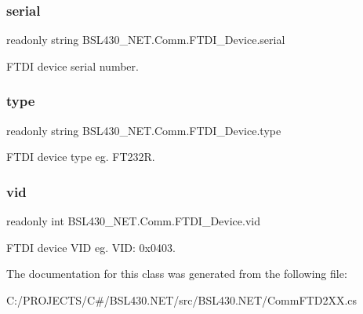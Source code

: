\subsubsection{\texorpdfstring{serial}{serial}}
{\footnotesize\ttfamily readonly string B\+S\+L430\+\_\+\+N\+E\+T.\+Comm.\+F\+T\+D\+I\+\_\+\+Device.\+serial}



F\+T\+DI device serial number. 

\mbox{\label{class_b_s_l430___n_e_t_1_1_comm_1_1_f_t_d_i___device_a08ecf8436a9e6e20ce5041d7899f822c}} 
\subsubsection{\texorpdfstring{type}{type}}
{\footnotesize\ttfamily readonly string B\+S\+L430\+\_\+\+N\+E\+T.\+Comm.\+F\+T\+D\+I\+\_\+\+Device.\+type}



F\+T\+DI device type eg. F\+T232R. 

\mbox{\label{class_b_s_l430___n_e_t_1_1_comm_1_1_f_t_d_i___device_a898c89b3775fbf5dd54da1fdf03330c0}} 
\subsubsection{\texorpdfstring{vid}{vid}}
{\footnotesize\ttfamily readonly int B\+S\+L430\+\_\+\+N\+E\+T.\+Comm.\+F\+T\+D\+I\+\_\+\+Device.\+vid}



F\+T\+DI device V\+ID eg. V\+ID\+: 0x0403. 



The documentation for this class was generated from the following file\+:\begin{DoxyCompactItemize}
\item 
C\+:/\+P\+R\+O\+J\+E\+C\+T\+S/\+C\#/\+B\+S\+L430.\+N\+E\+T/src/\+B\+S\+L430.\+N\+E\+T/Comm\+F\+T\+D2\+X\+X.\+cs\end{DoxyCompactItemize}
